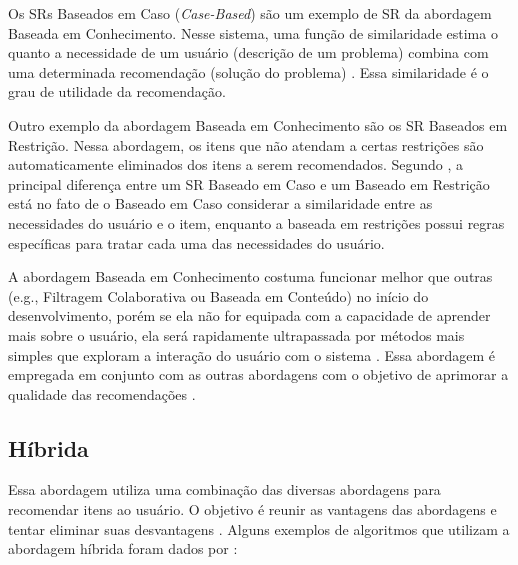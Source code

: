 Os SRs Baseados em Caso (\textit{Case-Based}) são um exemplo de SR da abordagem Baseada em Conhecimento. Nesse sistema, uma
função de similaridade estima o quanto a necessidade de um usuário (descrição de um problema) combina com uma
determinada recomendação (solução do problema) \cite{ricci2011introduction}. Essa similaridade é o grau de utilidade
da recomendação.

Outro exemplo da abordagem Baseada em Conhecimento são os SR Baseados em Restrição. Nessa abordagem, os itens que não
atendam a certas restrições são automaticamente eliminados dos itens a serem recomendados. Segundo
, a principal diferença entre um SR Baseado em Caso e um Baseado em Restrição está
no fato de o Baseado em Caso considerar a similaridade entre as necessidades do usuário e o item, enquanto a baseada
em restrições possui regras específicas para tratar cada uma das necessidades do usuário.

A abordagem Baseada em Conhecimento costuma funcionar melhor que outras (e.g., Filtragem Colaborativa ou Baseada em
Conteúdo) no início do desenvolvimento, porém se ela não for equipada com a capacidade de aprender mais sobre o usuário,
ela será rapidamente ultrapassada por métodos mais simples que exploram a interação do usuário com o sistema
\cite{ricci2011introduction}. Essa abordagem é empregada em conjunto com as outras abordagens com o objetivo de aprimorar
a qualidade das recomendações \cite{burke2002hybrid}.

\subsection{Híbrida}

Essa abordagem utiliza uma combinação das diversas abordagens para recomendar itens ao usuário. O objetivo é reunir as
vantagens das abordagens e tentar eliminar suas desvantagens \cite{burke2002hybrid}. Alguns exemplos de algoritmos que
utilizam a abordagem híbrida foram dados por :

